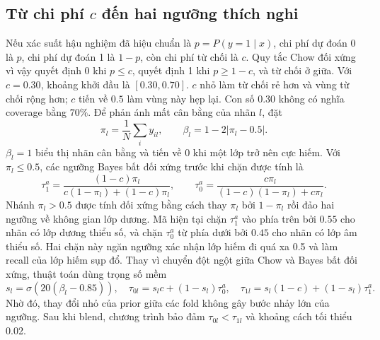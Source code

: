 \documentclass[11pt,a4paper,twoside]{article}
\begin{document}
\subsection{Từ chi phí $c$ đến hai ngưỡng thích nghi}
Nếu xác suất hậu nghiệm đã hiệu chuẩn là $p=P(y=1\mid x)$, chi phí dự đoán 0 là $p$, chi phí dự đoán 1 là $1-p$, còn chi phí từ chối là $c$. Quy tắc Chow đối xứng vì vậy quyết định 0 khi $p\le c$, quyết định 1 khi $p\ge 1-c$, và từ chối ở giữa. Với $c=0.30$, khoảng khởi đầu là $[0.30,0.70]$. $c$ nhỏ làm từ chối rẻ hơn và vùng từ chối rộng hơn; $c$ tiến về $0.5$ làm vùng này hẹp lại. Con số $0.30$ không có nghĩa coverage bằng $70\%$.
Để phản ánh mất cân bằng của nhãn $l$, đặt
\begin{equation}\pi_l=\frac{1}{N}\sum_i y_{il},\qquad \beta_l=1-2|\pi_l-0.5|.\end{equation}
$\beta_l=1$ biểu thị nhãn cân bằng và tiến về 0 khi một lớp trở nên cực hiếm. Với $\pi_l\le0.5$, các ngưỡng Bayes bất đối xứng trước khi chặn được tính là
\begin{equation}\tau^{a}_{1}=\frac{(1-c)\pi_l}{c(1-\pi_l)+(1-c)\pi_l},\qquad \tau^{a}_{0}=\frac{c\pi_l}{(1-c)(1-\pi_l)+c\pi_l}.\end{equation}
Nhánh $\pi_l>0.5$ được tính đối xứng bằng cách thay $\pi_l$ bởi $1-\pi_l$ rồi đảo hai ngưỡng về không gian lớp dương. Mã hiện tại chặn $\tau_1^a$ vào phía trên bởi $0.55$ cho nhãn có lớp dương thiểu số, và chặn $\tau_0^a$ từ phía dưới bởi $0.45$ cho nhãn có lớp âm thiểu số. Hai chặn này ngăn ngưỡng xác nhận lớp hiếm đi quá xa 0.5 và làm recall của lớp hiếm sụp đổ.
Thay vì chuyển đột ngột giữa Chow và Bayes bất đối xứng, thuật toán dùng trọng số mềm
\begin{equation}s_l=\sigma\!\left(20(\beta_l-0.85)\right),\quad \tau_{0l}=s_lc+(1-s_l)\tau^a_0,\quad \tau_{1l}=s_l(1-c)+(1-s_l)\tau^a_1.\end{equation}
Nhờ đó, thay đổi nhỏ của prior giữa các fold không gây bước nhảy lớn của ngưỡng. Sau khi blend, chương trình bảo đảm $\tau_{0l}<\tau_{1l}$ và khoảng cách tối thiểu 0.02.
\end{document}
